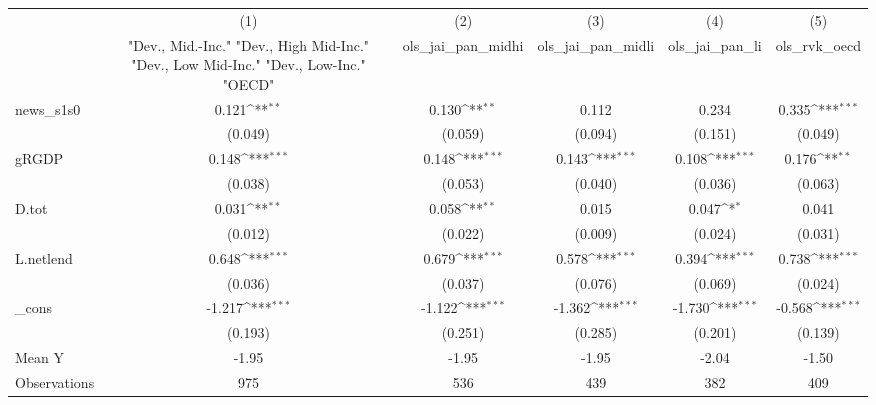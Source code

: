 {
\def\sym#1{\ifmmode^{#1}\else\(^{#1}\)\fi}
\begin{tabular}{l*{5}{c}}
\toprule
            &\multicolumn{1}{c}{(1)}&\multicolumn{1}{c}{(2)}&\multicolumn{1}{c}{(3)}&\multicolumn{1}{c}{(4)}&\multicolumn{1}{c}{(5)}\\
            &\multicolumn{1}{c}{ "Dev., Mid.-Inc." "Dev., High Mid-Inc." "Dev., Low Mid-Inc." "Dev., Low-Inc." "OECD" }&\multicolumn{1}{c}{ols\_jai\_pan\_midhi}&\multicolumn{1}{c}{ols\_jai\_pan\_midli}&\multicolumn{1}{c}{ols\_jai\_pan\_li}&\multicolumn{1}{c}{ols\_rvk\_oecd}\\
\midrule
news\_s1s0   &       0.121\sym{**} &       0.130\sym{**} &       0.112         &       0.234         &       0.335\sym{***}\\
            &     (0.049)         &     (0.059)         &     (0.094)         &     (0.151)         &     (0.049)         \\
\addlinespace
gRGDP       &       0.148\sym{***}&       0.148\sym{***}&       0.143\sym{***}&       0.108\sym{***}&       0.176\sym{**} \\
            &     (0.038)         &     (0.053)         &     (0.040)         &     (0.036)         &     (0.063)         \\
\addlinespace
D.tot       &       0.031\sym{**} &       0.058\sym{**} &       0.015         &       0.047\sym{*}  &       0.041         \\
            &     (0.012)         &     (0.022)         &     (0.009)         &     (0.024)         &     (0.031)         \\
\addlinespace
L.netlend   &       0.648\sym{***}&       0.679\sym{***}&       0.578\sym{***}&       0.394\sym{***}&       0.738\sym{***}\\
            &     (0.036)         &     (0.037)         &     (0.076)         &     (0.069)         &     (0.024)         \\
\addlinespace
\_cons      &      -1.217\sym{***}&      -1.122\sym{***}&      -1.362\sym{***}&      -1.730\sym{***}&      -0.568\sym{***}\\
            &     (0.193)         &     (0.251)         &     (0.285)         &     (0.201)         &     (0.139)         \\
\midrule
Mean Y      &       -1.95         &       -1.95         &       -1.95         &       -2.04         &       -1.50         \\
Observations&         975         &         536         &         439         &         382         &         409         \\
\bottomrule
\end{tabular}
}
